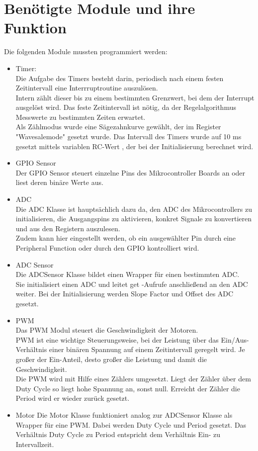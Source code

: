 \documentclass[a4paper,10pt,twoside]{report}
\begin{document}
\section{Benötigte Module und ihre Funktion}
Die folgenden Module mussten programmiert werden:
\begin{itemize}
\item Timer:\\
Die Aufgabe des Timers besteht darin, periodisch nach einem festen Zeitintervall eine Interrruptroutine auszulösen.\\ Intern zählt dieser bis zu einem bestimmten Grenzwert, bei dem der Interrupt ausgelöst wird. Das feste Zeitintervall ist nötig, da der Regelalgorithmus Messwerte zu bestimmten Zeiten erwartet.\\
Als Zählmodus wurde eine Sägezahnkurve gewählt, der im Register "Wavesalemode" gesetzt wurde. Das Intervall des Timers wurde auf 10 ms gesetzt mittels variablen RC-Wert , der bei der Initialisierung berechnet wird.
\item GPIO Sensor\\
Der GPIO Sensor steuert einzelne Pins des Mikrocontroller Boards an oder liest deren binäre Werte aus.
\item ADC\\
Die ADC Klasse ist hauptsächlich dazu da, den ADC des Mikrocontrollers zu initialisieren, die Ausgangspins zu aktivieren, konkret Signale zu konvertieren und aus den Registern auszulesen.\\ 
Zudem kann hier eingestellt werden, ob ein ausgewählter Pin durch eine Peripheral Function oder durch den GPIO kontrolliert wird.
\item ADC Sensor\\
Die ADCSensor Klasse bildet einen Wrapper für einen bestimmten ADC.\\
Sie initialisiert einen ADC und leitet get -Aufrufe anschließend an den ADC weiter. Bei der Initialisierung werden Slope Factor und Offset des ADC gesetzt.\\
\item PWM\\
Das PWM Modul steuert die Geschwindigkeit der Motoren.\\
PWM ist eine wichtige Steuerungsweise, bei der Leistung über das Ein/Aus-Verhältnis einer binären Spannung auf einem Zeitintervall geregelt wird.
Je großer der Ein-Anteil, desto großer die Leistung und damit die Geschwindigkeit.\\
Die PWM wird mit Hilfe eines Zählers umgesetzt. Liegt der Zähler über dem Duty Cycle so liegt hohe Spannung an, sonst null. Erreicht der Zähler die Period wird er wieder zurück gesetzt.
\item Motor
Die Motor Klasse funktioniert analog zur ADCSensor Klasse als Wrapper für eine PWM.
Dabei werden Duty Cycle und Period gesetzt.
Das Verhältnis Duty Cycle zu Period entspricht dem Verhältnis Ein- zu Intervallzeit.

\end{itemize}
\end{document}
